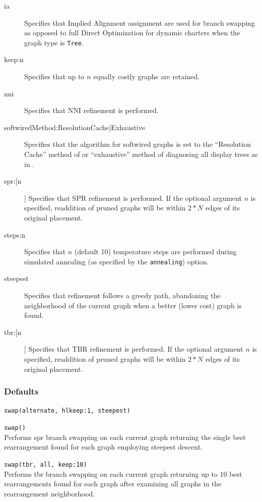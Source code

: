 \begin{description}
\begin{description}
			\end{description}
		
			\item[ia] Specifies that Implied Alignment \citep{Wheeler2003} assignment are used for 
			branch swapping as opposed to full Direct Optimization for dynamic charters when the 
			graph type is \texttt{Tree}.
		
			\item[keep:n] Specifies that up to $n$ equally costly graphs are retained.
		
			\item[nni] Specifies that NNI refinement \citep{CaminandSokal1965, Robinson1971} 
			is performed.
			
			\item[softwiredMethod:ResolutionCache|Exhaustive] Specifies that the algorithm for 
			softwired graphs is set to the ``Resolution Cache'' method of \cite{WheelerandWashburn2023} 
			or ``exhaustive'' method of diagnosing all display trees as in \cite{Wheeler2015}.
		
			\item[spr:[n]] Specifies that SPR refinement \citep{Dayhoff1969} is performed. If the 
			optional argument $n$ is specified, readdition of pruned graphs will be within $2 * N$ 
			edges of its original placement.
		
			\item[steps:n] Specifies that $n$ (default 10) temperature steps are performed during 
			simulated annealing (as specified by the \texttt{annealing}) option.
		
			\item[steepest] Specifies that refinement follows a greedy path, abandoning the neighborhood 
			of the current graph when a better (lower cost) graph is found.
		
			\item[tbr:[n]] Specifies that TBR refinement \citep{Farris1988, swofford1990a} is performed. If the 
			optional argument $n$ is specified, readdition of pruned graphs will be within $2 * N$ edges of its 
			original placement.
		\end{description}	
		
		\subsubsection{Defaults}
			\texttt{swap(alternate, hl{keep:1, steepest})}
		
		\begin{example}
			\item{\texttt{swap()}\\Performs spr branch swapping on each current graph returning the single 
			best rearrangement found for each graph employing steepest descent.}
			
			\item{\texttt{swap(tbr, all, keep:10)}\\Performs tbr branch swapping on each current graph 
			returning up to 10 best rearrangements found for each graph after examining all graphs in 
			the rearrangement neighborhood.}
		\end{example}
	

